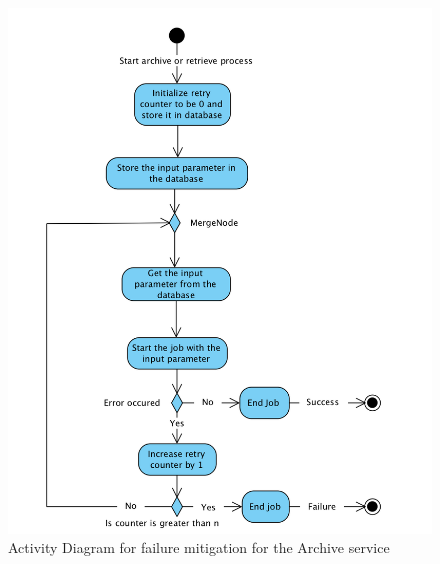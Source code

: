 \begin{figure}[H]
    \centering \includegraphics[scale=0.6]{grafiken/activityFailure.png}
    \caption{Activity Diagram for failure mitigation for the Archive service \cite{Hangfire}}
    \label{fig:activityFailure}
\end{figure}
